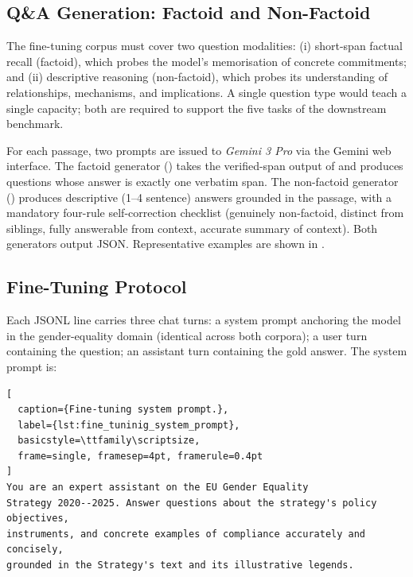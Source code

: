 \documentclass[pdflatex, sn-apa]{sn-jnl}%
\theoremstyle{thmstyleone}%
\theoremstyle{thmstyletwo}%
\theoremstyle{thmstylethree}%
\begin{document}
\subsection{Q\&A Generation: Factoid and Non-Factoid}
\label{sec:method:qa}

The fine-tuning corpus must cover two question modalities: (i) short-span
factual recall (factoid), which probes the model's memorisation of concrete
commitments; and (ii) descriptive reasoning (non-factoid), which probes its
understanding of relationships, mechanisms, and implications. A single question
type would teach a single capacity; both are required to support the five tasks
of the downstream benchmark.

For each passage, two prompts are issued to \textit{Gemini 3 Pro} via the Gemini
web interface. The factoid generator () takes
the verified-span output of  and produces questions whose
answer is exactly one verbatim span. The non-factoid generator
() produces descriptive (1--4 sentence)
answers grounded in the passage, with a mandatory four-rule self-correction
checklist (genuinely non-factoid, distinct from siblings, fully answerable from
context, accurate summary of context). Both generators output JSON.
Representative examples are shown in .






\subsection{Fine-Tuning Protocol}
\label{sec:method:finetune}

Each JSONL line carries three chat turns: a system prompt anchoring the model in
the gender-equality domain (identical across both corpora); a user turn
containing the question; an assistant turn containing the gold answer. The
system prompt is:

\begin{lstlisting}[
  caption={Fine-tuning system prompt.},
  label={lst:fine_tuninig_system_prompt},
  basicstyle=\ttfamily\scriptsize,
  frame=single, framesep=4pt, framerule=0.4pt
]
You are an expert assistant on the EU Gender Equality
Strategy 2020--2025. Answer questions about the strategy's policy objectives,
instruments, and concrete examples of compliance accurately and concisely,
grounded in the Strategy's text and its illustrative legends.
\end{lstlisting}
\end{document}
